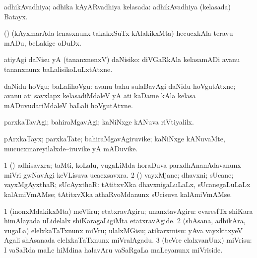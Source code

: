 \bentry
{}
\gl{\gu}
\bmng
adhikAvadhiya; adhika kAyARvadhiya kelasada:  adhikAvadhiya (kelasada) Batayx. 
\emng
\eentry

\bentry
{}
\gl{\sakirx}
\bmng
(\CA) (kAyxmarAda lenasxnunx takakxSuTx kAlakikxMta) hecucxkAla teravu mADu, beLakige oDuDx. 
\emng
\eentry

\bentry
{}
\gl{\sakirx}
\bmng
atiyAgi daNisu yA (tananxnenxV) daNisiko:  diVGaRkAla kelasamADi avanu tananxnunx baLalisikoLuLxtAtxne. 
\emng

\noindent
\gl{\akirx}
\bmng
daNidu hoVgu; baLalihoVgu:  avanu bahu sulaBavAgi daNidu hoVgutAtxne; avanu ati savxlapx kelasadiMdaleV yA ati kaDame kAla kelasa mADuvudariMdaleV baLali hoVgutAtxne. 
\emng
\eentry

\bentry
{}
\gl{\kirxvi}
\bmng
parxkaTavAgi; bahiraMgavAgi; kaNiNxge kANuva riVtiyalilx. 
\emng
\eentry

\bentry
{}
\gl{\nA}
\bmng
pArxkaTayx; parxkaTate; bahiraMgavAgiruvike; kaNiNxge kANuvaMte, mucucxmareyilalxde--iruvike yA mADuvike. 
\emng
\eentry

\bentry
{}
\gl{\nA}
\bmng
\bnum
\num{1} (\saM) adhisavxra; taMti, koLalu, \mo vugaLiMda horaDuva parxdhAnanAdavanunx miVri gwNavAgi keVLisuva ucacxsavxra. 
\num{2} (\rUpa) vayxMjane; dhavxni; sUcane; vayxMgAyxthaR; sUcAyxthaR:  tAtitxvXka dhavxnigaLuLaLx, sUcanegaLuLaLx kalAmiVmAMse; tAtitxvXka athaRvoMdanunx sUcisuva kalAmiVmAMse. 
\enum
\emng
\eentry

\bentry
{}
\gl{\sakirx}
\bmng
\bnum
\num{1} (inonxMdakikxMta) meVliru; etatxravAgiru; unanxtavAgiru:  evaresfTx shiKara himAlayada uLidelalx shiKaragaLigiMta etatxravAgide. 
\num{2} (shAsana, adhikAra, \mo vugaLa) elelxkaTaTxnunx miVru; ulalxMGisu; atikarxmisu:  yAva vayxkitxyeV Agali shAsanada elelxkaTaTxnunx miVralAgadu. 
\num{3} (beVre elalxvanUnx) miVrisu:  I vaSaRda maLe hiMdina halavAru vaSaRgaLa maLeyanunx miVriside. 
\enum
\emng
\eentry

